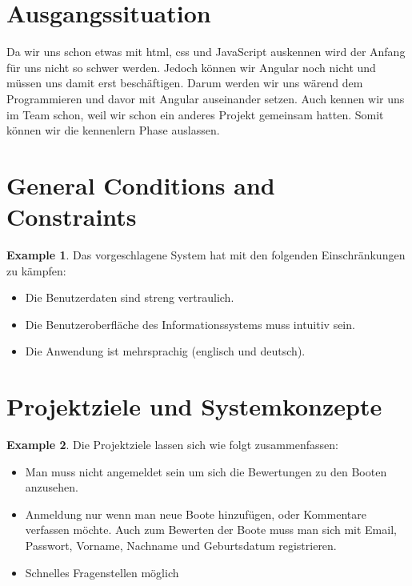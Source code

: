 \documentclass[12pt]{article}
\theoremstyle{definition}
\newtheorem{example}{Example}
\newenvironment{explanation}{%
   \setlength{\parindent}{0pt}
   \itshape
   \color{blue}
}{}
\begin{document}
\section{Ausgangssituation}
\begin{explanation}
Da wir uns schon etwas mit html, css und JavaScript auskennen wird der Anfang für uns nicht so schwer werden.
Jedoch können wir Angular noch nicht und müssen uns damit erst beschäftigen. Darum werden wir uns wärend dem Programmieren und davor mit Angular auseinander setzen. Auch kennen wir uns im Team schon, weil wir schon ein anderes Projekt gemeinsam hatten. Somit können wir die kennenlern Phase auslassen.
\end{explanation}

\pagebreak

\section{General Conditions and Constraints}

\begin{example}
Das vorgeschlagene System hat mit den folgenden Einschränkungen zu kämpfen:
\begin{itemize}
\item Die Benutzerdaten sind streng vertraulich.
\item Die Benutzeroberfläche des Informationssystems muss intuitiv sein.
\item Die Anwendung ist mehrsprachig (englisch und deutsch).
\end{itemize}
\end{example}

\pagebreak

\section{Projektziele und Systemkonzepte}
\begin{example}
Die Projektziele lassen sich wie folgt zusammenfassen:
\begin{itemize}
\item Man muss nicht angemeldet sein um sich die Bewertungen zu den Booten anzusehen.
\item Anmeldung nur wenn man neue Boote hinzufügen, oder Kommentare verfassen möchte.
Auch zum Bewerten der Boote muss man sich mit Email, Passwort, Vorname, Nachname und Geburtsdatum registrieren.
\item Schnelles Fragenstellen möglich
\end{itemize}
\end{example}
\end{document}
